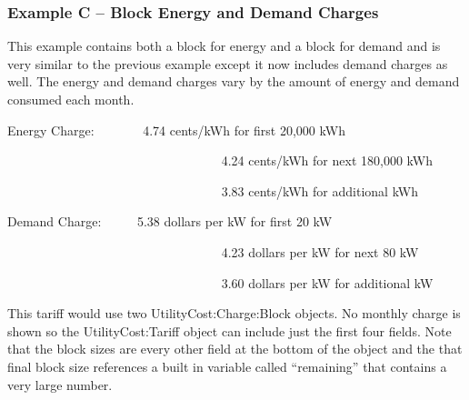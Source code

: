 \subsubsection{Example C -- Block Energy and Demand Charges}\label{example-c-block-energy-and-demand-charges}

This example contains both a block for energy and a block for demand and is very similar to the previous example except it now includes demand charges as well. The energy and demand charges vary by the amount of energy and demand consumed each month.

Energy Charge:~~~~~~~ 4.74 cents/kWh for first 20,000 kWh

~~~~~~~~~~~~~~~~~~~~~~~~~~~~~~~~~ 4.24 cents/kWh for next 180,000 kWh

~~~~~~~~~~~~~~~~~~~~~~~~~~~~~~~~~ 3.83 cents/kWh for additional kWh

Demand Charge:~~~~~ 5.38 dollars per kW for first 20 kW

~~~~~~~~~~~~~~~~~~~~~~~~~~~~~~~~~ 4.23 dollars per kW for next 80 kW

~~~~~~~~~~~~~~~~~~~~~~~~~~~~~~~~~ 3.60 dollars per kW for additional kW

This tariff would use two UtilityCost:Charge:Block objects. No monthly charge is shown so the UtilityCost:Tariff object can include just the first four fields. Note that the block sizes are every other field at the bottom of the object and the that final block size references a built in variable called ``remaining'' that contains a very large number.


